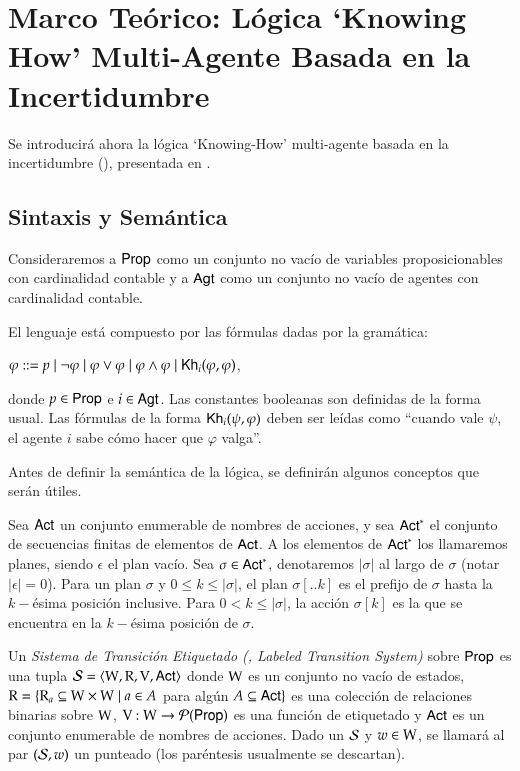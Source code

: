 \chapter{Marco Teórico: Lógica `Knowing How' Multi-Agente Basada en la Incertidumbre}
Se introducirá ahora la lógica `Knowing-How' multi-agente basada en la incertidumbre (\KHilogic), presentada en \cite{ArecesFSV25}.

\section{Sintaxis y Semántica}
Consideraremos a ${\rm \sf Prop}$ como un conjunto no vacío de variables proposicionables con cardinalidad contable 
y a ${\rm \sf Agt}$ como un conjunto no vacío de agentes con cardinalidad contable. 

\begin{definicion}
    El lenguaje \KHilogic está compuesto por las fórmulas dadas por la gramática:
    \begin{center}
        $\varphi ::= p \mid \neg \varphi \mid \varphi \vee \varphi \mid \varphi \wedge \varphi \mid \mathsf{Kh}_i(\varphi,\varphi)$,
    \end{center}
    donde $p \in {\rm \sf Prop}$ e $i \in {\rm \sf Agt}$. Las constantes booleanas son definidas de la forma usual. Las fórmulas de la forma 
    $\mathsf{Kh}_i(\psi, \varphi)$ deben ser leídas como ``cuando vale $\psi$, el agente $i$ sabe cómo hacer que $\varphi$ valga''.
\end{definicion}

Antes de definir la semántica de la lógica, se definirán algunos conceptos que serán útiles.

\begin{definicion}
    Sea ${\rm \sf Act}$ un conjunto enumerable de nombres de acciones, y sea ${\rm \sf Act}^*$ el conjunto de secuencias finitas de elementos de ${\rm \sf Act}$. 
    A los elementos de ${\rm \sf Act}^*$ los llamaremos planes, siendo $\epsilon$ el plan vacío. Sea $\sigma \in {\rm \sf Act}^*$, denotaremos $|\sigma|$ 
    al largo de $\sigma$ (notar $|\epsilon| = 0$). Para un plan $\sigma$ y $0 \leq k \leq |\sigma|$, el plan $\sigma[..k]$ es el prefijo 
    de $\sigma$ hasta la $k-$ésima posición inclusive. Para $0 < k \leq |\sigma|$, la acción $\sigma[k]$ es la que se encuentra en la 
    $k-$ésima posición de $\sigma$.  
\end{definicion}

\begin{definicion}
    Un \emph{Sistema de Transición Etiquetado (\lts, Labeled Transition System)} sobre ${\rm \sf Prop}$ es una tupla $\mathcal{S} = \langle \mathrm{W}, \mathrm{R}, \mathrm{V}, {\rm \sf Act} \rangle$ donde $\mathrm{W}$ es un conjunto no 
    vacío de estados, $\mathrm{R} = \{\mathrm{R}_a \subseteq \mathrm{W} \times \mathrm{W} \mid a \in A$ para algún $A \subseteq {\rm \sf Act}\}$ es una colección de relaciones binarias
    sobre $\mathrm{W}$, $\mathrm{V} : \mathrm{W} \to \mathcal{P}({\rm \sf Prop})$ es una función de etiquetado y ${\rm \sf Act}$ es un conjunto enumerable de nombres de acciones.
    Dado un \lts $\mathcal{S}$ y $w \in \mathrm{W}$, se llamará al par $(\mathcal{S},w)$ un \lts punteado (los paréntesis usualmente se descartan).
\end{definicion}

